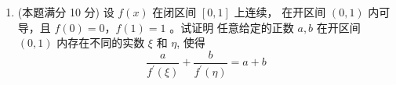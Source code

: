 \begin{enumerate}


\item 
(本题满分 10 分)
设 $f(x)$ 在闭区间 $[0,1]$ 上连续， 在开区间 $(0,1)$ 内可导，且 $f(0)=0$，$ f(1)=1$ 。试证明 任意给定的正数 $a, b$ 在开区间 $(0,1)$ 内存在不同的实数 $\xi$ 和 $\eta$, 使得 
\[ 
\frac{a}{f^{\prime}(\xi)}+\frac{b}{f^{\prime}(\eta)}=a+b
 \]


	
	






	
\end{enumerate}


